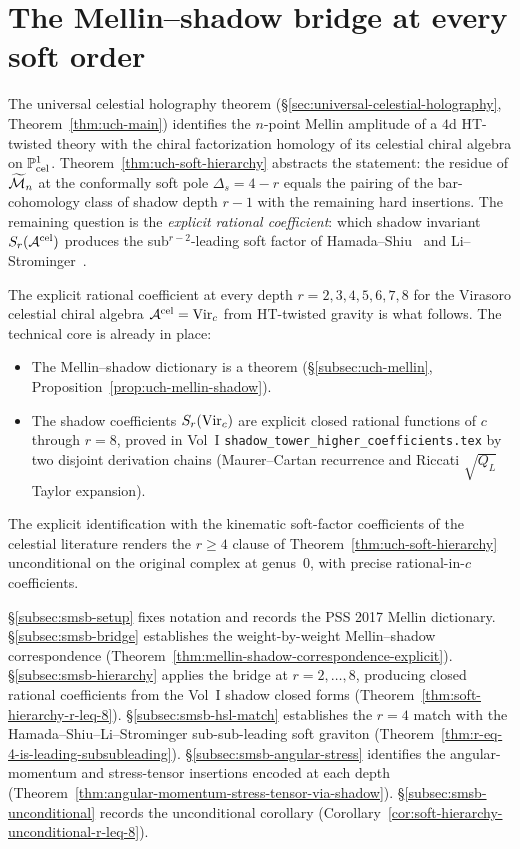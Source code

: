 \section{The Mellin--shadow bridge at every soft order}
\label{sec:soft-graviton-mellin-shadow-bridge-platonic}

\noindent
The universal celestial holography theorem
(\S\ref{sec:universal-celestial-holography},
Theorem~\ref{thm:uch-main}) identifies the $n$-point Mellin amplitude of
a $4$d HT-twisted theory with the chiral factorization homology of its
celestial chiral algebra on $\mathbb P^1_{\mathrm{cel}}$.
Theorem~\ref{thm:uch-soft-hierarchy} abstracts the statement: the
residue of $\widetilde{\mathcal M}_n$ at the conformally soft pole
$\Delta_s = 4 - r$ equals the pairing of the bar-cohomology class of
shadow depth $r - 1$ with the remaining hard insertions. The remaining
question is the \emph{explicit rational
coefficient}: which shadow invariant $S_r(\mathcal A^{\mathrm{cel}})$
produces the sub${}^{r - 2}$-leading soft factor of
Hamada--Shiu~\cite{HamadaShiuSubsubSoft} and Li--Strominger~\cite{LiStromingerHigherSoft}.

The explicit rational coefficient at every depth
$r = 2, 3, 4, 5, 6, 7, 8$ for the Virasoro celestial chiral algebra
$\mathcal A^{\mathrm{cel}} = \mathrm{Vir}_c$ from HT-twisted gravity is what follows.
The technical core is already in place:
\begin{itemize}
\item The Mellin--shadow dictionary is a theorem
(\S\ref{subsec:uch-mellin}, Proposition~\ref{prop:uch-mellin-shadow}).
\item The shadow coefficients $S_r(\mathrm{Vir}_c)$ are explicit closed rational
functions of $c$ through $r = 8$, proved in Vol~I
\texttt{shadow\_tower\_higher\_coefficients.tex} by two disjoint
derivation chains (Maurer--Cartan recurrence and Riccati
$\sqrt{Q_L}$ Taylor expansion).
\end{itemize}
The explicit identification with the
kinematic soft-factor coefficients of the celestial literature renders
the $r \geq 4$ clause of Theorem~\ref{thm:uch-soft-hierarchy}
unconditional on the original complex at genus~$0$, with precise
rational-in-$c$ coefficients.

\S\ref{subsec:smsb-setup} fixes notation and records the PSS 2017
Mellin dictionary. \S\ref{subsec:smsb-bridge} establishes the
weight-by-weight Mellin--shadow correspondence
(Theorem~\ref{thm:mellin-shadow-correspondence-explicit}).
\S\ref{subsec:smsb-hierarchy} applies the bridge at $r = 2, \ldots, 8$,
producing closed rational coefficients from the Vol~I shadow closed
forms (Theorem~\ref{thm:soft-hierarchy-r-leq-8}).
\S\ref{subsec:smsb-hsl-match} establishes the $r = 4$ match with the
Hamada--Shiu--Li--Strominger sub-sub-leading soft graviton
(Theorem~\ref{thm:r-eq-4-is-leading-subsubleading}).
\S\ref{subsec:smsb-angular-stress} identifies the angular-momentum and
stress-tensor insertions encoded at each depth
(Theorem~\ref{thm:angular-momentum-stress-tensor-via-shadow}).
\S\ref{subsec:smsb-unconditional} records the unconditional corollary
(Corollary~\ref{cor:soft-hierarchy-unconditional-r-leq-8}).

